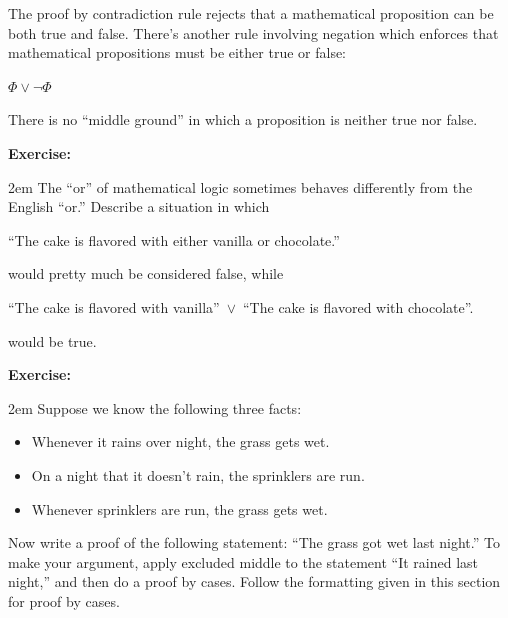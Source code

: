 \documentclass[12pt]{article}
\newcommand{\OR}{\vee}
\newcommand{\ex}[1]{\textbf{Exercise:}\begin{adjustwidth}{2em}{}#1\end{adjustwidth}}
\newcommand{\RULE}[2]{\begin{tcolorbox}[title=Rule: #1,colbacktitle=white,coltitle=black,colback=white]#2\end{tcolorbox}}
\def\pA{\Phi}
\begin{document}
The proof by contradiction rule rejects that a mathematical proposition can be both true and false.
There's
another rule involving negation which
enforces that mathematical propositions must be either true or false:
\RULE{Excluded middle}{
$\pA\OR\neg\pA$
}
There is no ``middle ground'' in which a proposition is neither true nor false.













\ex{
The ``or'' of mathematical logic sometimes behaves differently from the English ``or.''
Describe a situation in which
\begin{center} ``The cake is flavored with either vanilla or chocolate.'' \end{center}
would pretty much be considered false, while
\begin{center} ``The cake is flavored with vanilla''\ $\OR$\ ``The cake is flavored with chocolate''. \end{center}
would be true.
}


\ex{
Suppose we know the following three facts:
\begin{itemize}
\item Whenever it rains over night, the grass gets wet. 
\item On a night that it doesn't rain, the sprinklers are run.
\item Whenever sprinklers are run, the grass gets wet.
\end{itemize}
Now write a proof of the following statement: ``The grass got wet last night.''
To make your argument, apply excluded middle to the statement ``It rained last night,''
and then do a proof by cases.
Follow the formatting given in this section for proof by cases.
}
\end{document}
